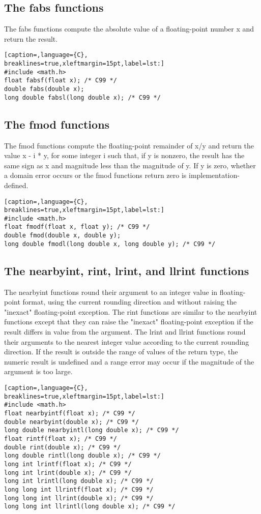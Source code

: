 \subsection{The fabs functions}
The fabs functions compute the absolute value of a floating-point number x and
return the result.
\lstset{basicstyle=\scriptsize, numbers=left, captionpos=b, tabsize=4}
\begin{lstlisting}[caption=,language={C},
breaklines=true,xleftmargin=15pt,label=lst:]
#include <math.h>
float fabsf(float x); /* C99 */
double fabs(double x); 
long double fabsl(long double x); /* C99 */
\end{lstlisting}

\subsection{The fmod functions}
The fmod functions compute the floating-point remainder of x/y and return the
value x - i * y, for some integer i such that, if y is nonzero, the result has
the same sign as x and magnitude less than the magnitude of y. If y is zero,
whether a domain error occurs or the fmod functions return zero is
implementation-defined.
\lstset{basicstyle=\scriptsize, numbers=left, captionpos=b, tabsize=4}
\begin{lstlisting}[caption=,language={C},
breaklines=true,xleftmargin=15pt,label=lst:]
#include <math.h>
float fmodf(float x, float y); /* C99 */
double fmod(double x, double y);
long double fmodl(long double x, long double y); /* C99 */
\end{lstlisting}

\subsection{The nearbyint, rint, lrint, and llrint functions}
The nearbyint functions round their argument to an integer value in
floating-point format, using the current rounding direction and without raising
the "inexact" floating-point exception.  The rint functions are similar to the
nearbyint functions except that they can raise the "inexact" floating-point
exception if the result differs in value from the argument.  The lrint and
llrint functions round their arguments to the nearest integer value according
to the current rounding direction. If the result is outside the range of values
of the return type, the numeric result is undefined and a range error may occur
if the magnitude of the argument is too large.
\lstset{basicstyle=\scriptsize, numbers=left, captionpos=b, tabsize=4}
\begin{lstlisting}[caption=,language={C},
breaklines=true,xleftmargin=15pt,label=lst:]
#include <math.h>
float nearbyintf(float x); /* C99 */
double nearbyint(double x); /* C99 */
long double nearbyintl(long double x); /* C99 */
float rintf(float x); /* C99 */
double rint(double x); /* C99 */
long double rintl(long double x); /* C99 */
long int lrintf(float x); /* C99 */
long int lrint(double x); /* C99 */
long int lrintl(long double x); /* C99 */
long long int llrintf(float x); /* C99 */
long long int llrint(double x); /* C99 */
long long int llrintl(long double x); /* C99 */
\end{lstlisting}

